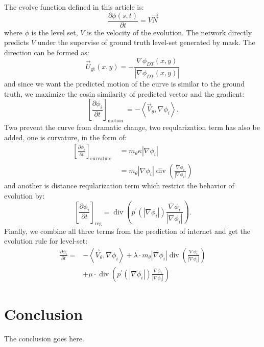 \documentclass[journal]{IEEEtran}
\begin{document}
The evolve function defined in this article is:
\begin{equation}
  \frac{\partial \phi(s, t)}{\partial t}=V \vec{N}
\end{equation}
where $\phi$ is the level set, $V$ is the velocity of the evolution. The network directly predicts $V$ under the supervise of ground truth level-set generated by mask. The direction can be formed as:
\begin{equation}
  \vec{U}_{\mathrm{gt}}(x, y)=-\frac{\nabla \phi_{D T}(x, y)}{\left|\nabla \phi_{D T}(x, y)\right|}
\end{equation}
and since we want the predicted motion of the curve is similar to the ground truth, we maximize the cosin similarity of predicted vector and the gradient:
\begin{equation}
  \left[\frac{\partial \phi_{i}}{\partial t}\right]_{\text {motion }}=-\left\langle\vec{V}_{\theta}, \nabla \phi_{i}\right\rangle.
\end{equation}
Two prevent the curve from dramatic change, two reqularization term has also be added, one is curvature, in the form of:
\begin{equation}
  \begin{aligned}
  \left[\frac{\partial \phi_{i}}{\partial t}\right]_{\text {curvature }} &=m_{\theta} \kappa\left|\nabla \phi_{i}\right| \\
  &=m_{\theta}\left|\nabla \phi_{i}\right| \operatorname{div}\left(\frac{\nabla \phi_{i}}{\left|\nabla \phi_{i}\right|}\right) 
  \end{aligned}
\end{equation}
and another is distance reqularization term which restrict the behavior of evolution by:
\begin{equation}
  \left[\frac{\partial \phi_{i}}{\partial t}\right]_{\mathrm{reg}}=\operatorname{div}\left(p^{\prime}\left(\left|\nabla \phi_{i}\right|\right) \frac{\nabla \phi_{i}}{\left|\nabla \phi_{i}\right|}\right).
\end{equation}
Finally, we combine all three terms from the prediction of internet and get the evolution rule for level-set:
\begin{equation}
  \begin{aligned}
  \frac{\partial \phi_{i}}{\partial t}=&-\left\langle\vec{V}_{\theta}, \nabla \phi_{i}\right\rangle+\lambda \cdot m_{\theta}\left|\nabla \phi_{i}\right| \operatorname{div}\left(\frac{\nabla \phi_{i}}{\left|\nabla \phi_{i}\right|}\right) \\
  &+\mu \cdot \operatorname{div}\left(p^{\prime}\left(\left|\nabla \phi_{i}\right|\right) \frac{\nabla \phi_{i}}{\left|\nabla \phi_{i}\right|}\right)
  \end{aligned}
\end{equation}
\section{Conclusion}
The conclusion goes here.\cite{han2020survey}

\ifCLASSOPTIONcaptionsoff
  \newpage
\fi



\end{document}
